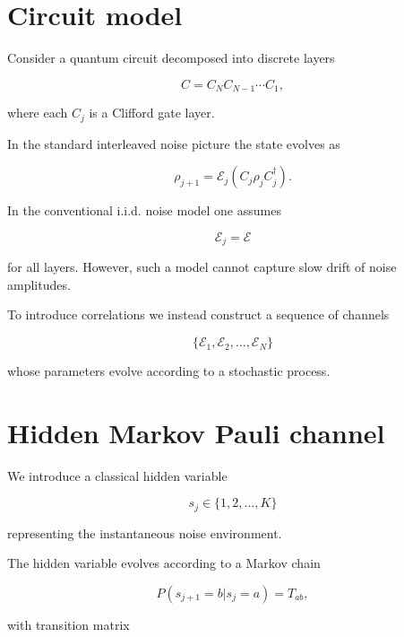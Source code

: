 \documentclass[11pt]{article}
\begin{document}
\section{Circuit model}

Consider a quantum circuit decomposed into discrete layers

\begin{equation}
C = C_N C_{N-1}\cdots C_1 ,
\end{equation}

where each $C_j$ is a Clifford gate layer.

In the standard interleaved noise picture the state evolves as

\begin{equation}
\rho_{j+1} = \mathcal{E}_j \left(C_j \rho_j C_j^\dagger\right).
\end{equation}

In the conventional i.i.d. noise model one assumes

\begin{equation}
\mathcal{E}_j = \mathcal{E}
\end{equation}

for all layers. 
However, such a model cannot capture slow drift of noise amplitudes.

To introduce correlations we instead construct a sequence of channels

\begin{equation}
\{\mathcal{E}_1,\mathcal{E}_2,\ldots,\mathcal{E}_N\}
\end{equation}

whose parameters evolve according to a stochastic process.

\section{Hidden Markov Pauli channel}

We introduce a classical hidden variable

\begin{equation}
s_j \in \{1,2,\dots,K\}
\end{equation}

representing the instantaneous noise environment.

The hidden variable evolves according to a Markov chain

\begin{equation}
P(s_{j+1}=b|s_j=a) = T_{ab},
\end{equation}

with transition matrix
\end{document}
